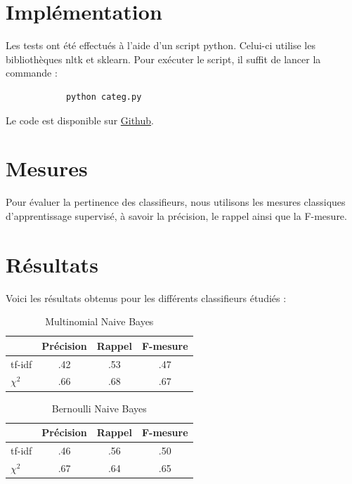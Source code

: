 \documentclass[a4paper,12pt]{article}
\begin{document}
	\section*{Implémentation}
		Les tests ont été effectués à l'aide d'un script python. Celui-ci utilise les bibliothèques nltk et sklearn. Pour exécuter le script, il suffit de lancer la commande :
		\begin{verbatim}
			python categ.py
		\end{verbatim}
		Le code est disponible sur \href{https://github.com/Ehtaga/document-categorization}{Github}.

	\section*{Mesures}
		Pour évaluer la pertinence des classifieurs, nous utilisons les mesures classiques d'apprentissage supervisé, à savoir la précision, le rappel ainsi que la F-mesure.

	\section*{Résultats}
		Voici les résultats obtenus pour les différents classifieurs étudiés :

		\begin{table}[h!]
			\centering
			\begin{tabular}{l|c c c}
				& Précision & Rappel & F-mesure\\
				\hline
				tf-idf & .42 & .53 & .47\\
				$\chi^2$ & .66 & .68 & .67\\
			\end{tabular}
			\caption{Multinomial Naive Bayes}
		\end{table}

		\begin{table}[h!]
			\centering
			\begin{tabular}{l|c c c}
				& Précision & Rappel & F-mesure\\
				\hline
				tf-idf & .46 & .56 & .50\\
				$\chi^2$ & .67 & .64 & .65\\
			\end{tabular}
			\caption{Bernoulli Naive Bayes}
		\end{table}
\end{document}
